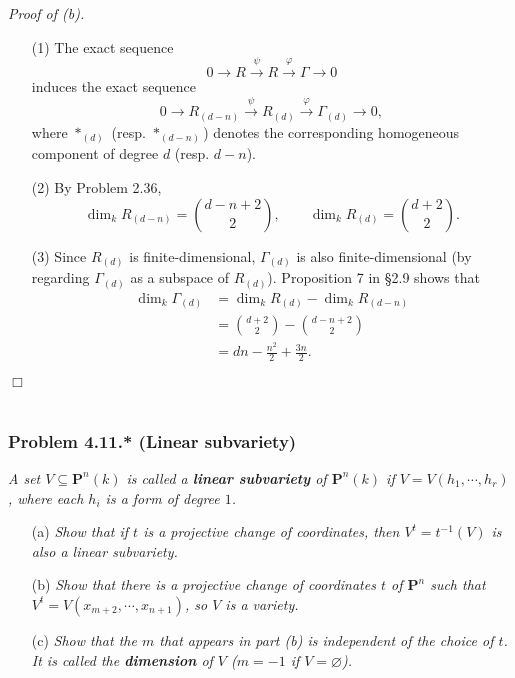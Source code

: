 \documentclass{article}
\begin{document}
\emph{Proof of (b).}
\begin{enumerate}
\item[(1)]
  The exact sequence
  \[
    0
    \to R
    \xrightarrow{\psi} R
    \xrightarrow{\varphi} \Gamma
    \to 0
  \]
  induces the exact sequence
  \[
    0
    \to R_{(d-n)}
    \xrightarrow{\psi} R_{(d)}
    \xrightarrow{\varphi} \Gamma_{(d)}
    \to 0,
  \]
  where $*_{(d)}$ (resp. $*_{(d-n)}$) denotes
  the corresponding homogeneous component of degree $d$ (resp. $d-n$).

\item[(2)]
  By Problem 2.36,
  \[
    \dim_k R_{(d-n)} = {d-n+2 \choose 2},
    \qquad
    \dim_k R_{(d)} = {d+2 \choose 2}.
  \]

\item[(3)]
  Since $R_{(d)}$ is finite-dimensional, $\Gamma_{(d)}$ is also finite-dimensional
  (by regarding $\Gamma_{(d)}$ as a subspace of $R_{(d)}$).
  Proposition 7 in \S 2.9 shows that
  \begin{align*}
    \dim_k \Gamma_{(d)}
    &= \dim_k R_{(d)} - \dim_k R_{(d-n)} \\
    &= {d+2 \choose 2} - {d-n+2 \choose 2} \\
    &= dn - \frac{n^2}{2} + \frac{3n}{2}.
  \end{align*}
\end{enumerate}
$\Box$ \\\\






\subsubsection*{Problem 4.11.* (Linear subvariety)}
\emph{A set $V \subseteq \mathbf{P}^{n}(k)$
is called a \textbf{linear subvariety} of $\mathbf{P}^{n}(k)$ if
$V = V(h_1, \cdots, h_r)$, where each $h_i$ is a form of degree $1$.}
\begin{enumerate}
\item[(a)]
  \emph{Show that if $t$ is a projective change of coordinates,
  then $V^{t} = t^{-1}(V)$ is also a linear subvariety.}

\item[(b)]
  \emph{Show that there is a projective change of coordinates $t$ of $\mathbf{P}^{n}$ such that
  $V^t = V(x_{m+2}, \cdots, x_{n+1})$, so $V$ is a variety.}

\item[(c)]
  \emph{Show that the $m$ that appears in part (b) is independent of the choice of $t$.
  It is called the \textbf{dimension} of $V$ ($m = -1$ if $V = \varnothing$).} \\
\end{enumerate}
\end{document}
